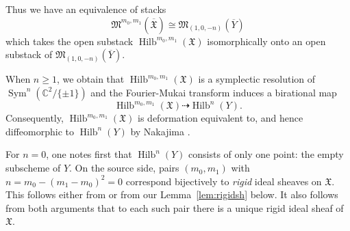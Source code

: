 \documentclass{amsart}
\theoremstyle{definition}
\newcommand{\CC} {{\mathbb C}}          %
\newcommand{\X}{\mathfrak{X}}
\newcommand{\Xbar}{\overline{\mathfrak{X}}}
\newcommand{\Ybar}{\overline{Y}}
\newcommand{\M}{\mathfrak{M}}
\newcommand{\Sym}{\operatorname{Sym}}
\newcommand{\Hilb}{\operatorname{Hilb}}
\newcommand{\adam}{\color{blue}}
\begin{document}
Thus we have an equivalence of stacks
\[
\M^{m_{0},m_{1}}(\Xbar ) \cong \M_{(1,0,-n)}(\Ybar )
\]
which takes the open substack $\Hilb^{m_{0},m_{1}}(\X )$ isomorphically
onto an open substack of $\M_{(1,0,-n)} (\Ybar )$. 
{\adam
When $n \geq 1$, we obtain that $\Hilb^{m_{0},m_{1}}(\X )$ is a symplectic resolution of $\Sym^{n} (\CC^{2}/\{\pm 1
\})$ and the Fourier-Mukai transform induces a birational map
\[
\Hilb^{m_{0},m_{1}}(\X ) \dashrightarrow \Hilb^{n}(Y).
\]
Consequently, $\Hilb^{m_{0},m_{1}}(\X )$ is deformation
equivalent to, and hence diffeomorphic to $\Hilb^{n}(Y)$ by Nakajima \cite[Cor~4.2]{Nakajima1994Duke}.

For $n=0$, one notes first that $\Hilb^{n}(Y)$ consists of only one point: the empty subscheme of $Y$. On the source side, pairs $(m_0,m_1)$ with $n=m_{0} -(m_{1}-m_{0})^{2}=0$ correspond bijectively to \emph{rigid} ideal sheaves on $\X$. This follows either from \cite[Theorem~4.6 and Example~2.25]{fujii2017combinatorial} or from our Lemma~\ref{lem:rigidsh} below. It also follows from both arguments that to each such pair there is a unique rigid ideal sheaf of $\X$.}
\end{document}
